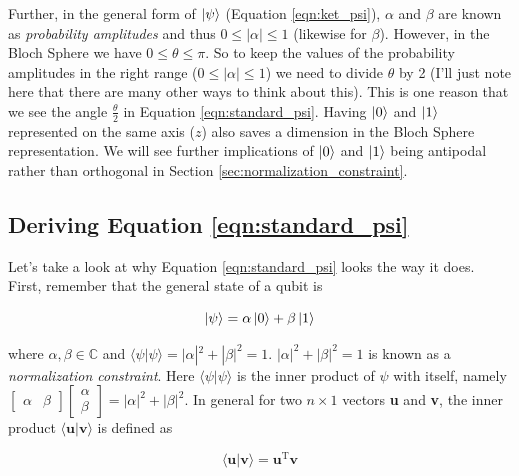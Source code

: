 \documentclass{article}
\theoremstyle{definition}
\begin{document}
\bigskip
\noindent
Further, in the general form of $\ket{\psi}$ (Equation
\ref{eqn:ket_psi}), $\alpha$ and $\beta$ are known as
\emph{probability amplitudes} \cite{2013arXiv1304.5824K} and thus
$0 \leq |\alpha| \leq 1$ (likewise for $\beta$). However, in the
Bloch Sphere we have $0 \leq \theta \leq \pi$. So to keep the
values of the probability amplitudes in the right range ($0 \leq
|\alpha| \leq 1$) we need to divide $\theta$ by 2 (I'll just note
here that there are many other ways to think about this).  This
is one reason that we see the angle $\frac{\theta}{2}$ in
Equation \ref{eqn:standard_psi}. Having $\ket{0}$ and $\ket{1}$
represented on the same axis ($z$) also saves a dimension in the
Bloch Sphere representation. We will see further implications of
$\ket{0}$ and $\ket{1}$ being antipodal rather than orthogonal in
Section \ref{sec:normalization_constraint}.

\subsection{Deriving Equation \ref{eqn:standard_psi}}
\label{subsec:derviing_equation_psi}
Let's take a look at why Equation \ref{eqn:standard_psi} looks
the way it does. First, remember that the general state of a
qubit is

\begin{equation}
\ket{\psi}  = \alpha \ket{0}  + \beta \ket{1}
\label{eqn:ket_psi}
\end{equation}

\bigskip
\noindent
where $\alpha, \beta \in \mathbb{C}$ and $\langle \psi | \psi
\rangle = |\alpha|^2 + |\beta|^2 = 1$.  $|\alpha|^2 + |\beta|^2 =
1$ is known as a \emph{normalization constraint}.  Here $\langle
\psi | \psi \rangle$ is the inner product of $\psi$ with itself,
namely $\begin{bmatrix} \alpha &
\beta \end{bmatrix} \begin{bmatrix} \alpha \\ \beta \end{bmatrix}
= |\alpha|^2 + |\beta|^2$.  In general for two $n \times 1$
vectors \textbf{u} and \textbf{v}, the inner product $\langle
\mathbf{u} | \mathbf{v} \rangle$ is defined as

\begin{equation*}
\langle \mathbf{u} | \mathbf{v} \rangle = \mathbf{u}{^\text{T}}\mathbf{v}
\end{equation*}
\end{document}

